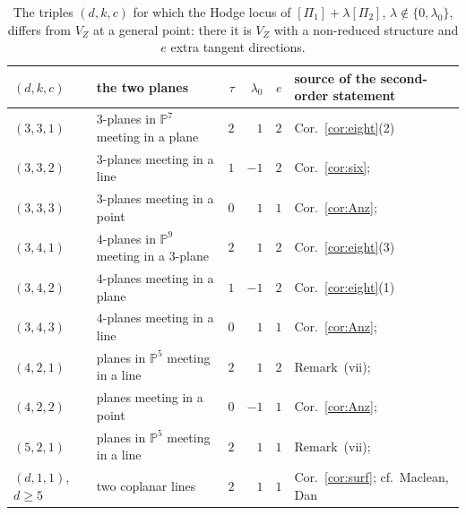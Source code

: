 \documentclass[11pt]{article}
\numberwithin{equation}{section}
\theoremstyle{remark}
\newcommand{\PP}{\mathbb{P}}
\newcommand{\VZ}{V_Z}
\newcommand{\lz}{\lambda_0}
\begin{document}
\begin{table}[ht]
\centering\small
\begin{tabular}{@{}llrrrl@{}}
\toprule
$(d,k,c)$ & the two planes & $\tau$ & $\lz$ & $e$ & source of the second-order statement\\
\midrule
$(3,3,1)$ & $3$-planes in $\PP^7$ meeting in a plane & $2$ & $1$ & $2$ & Cor.~\ref{cor:eight}(2)\\
$(3,3,2)$ & $3$-planes meeting in a line & $1$ & $-1$ & $2$ & Cor.~\ref{cor:six}; \cite{P1}\\
$(3,3,3)$ & $3$-planes meeting in a point & $0$ & $1$ & $1$ & Cor.~\ref{cor:Anz}; \cite{P1}\\
$(3,4,1)$ & $4$-planes in $\PP^9$ meeting in a $3$-plane & $2$ & $1$ & $2$ & Cor.~\ref{cor:eight}(3)\\
$(3,4,2)$ & $4$-planes meeting in a plane & $1$ & $-1$ & $2$ & Cor.~\ref{cor:eight}(1)\\
$(3,4,3)$ & $4$-planes meeting in a line & $0$ & $1$ & $1$ & Cor.~\ref{cor:Anz}; \cite{P1}\\
$(4,2,1)$ & planes in $\PP^5$ meeting in a line & $2$ & $1$ & $2$ & Remark~(vii); \cite{P1}\\
$(4,2,2)$ & planes meeting in a point & $0$ & $-1$ & $1$ & Cor.~\ref{cor:Anz}; \cite{P1}\\
$(5,2,1)$ & planes in $\PP^5$ meeting in a line & $2$ & $1$ & $1$ & Remark~(vii); \cite{P1}\\
$(d,1,1)$, $d\ge5$ & two coplanar lines & $2$ & $1$ & $1$ & Cor.~\ref{cor:surf}; cf.\ Maclean, Dan\\
\bottomrule
\end{tabular}
\caption{The triples $(d,k,c)$ for which the Hodge locus of $[\Pi_1]+\lambda[\Pi_2]$, $\lambda\notin\{0,\lz\}$, differs
from $\VZ$ at a general point: there it is $\VZ$ with a non-reduced structure and $e$ extra tangent
directions.}\label{tab:lin}
\end{table}
\end{document}
